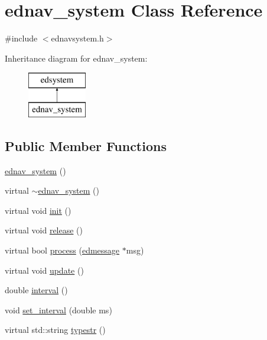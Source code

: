 \hypertarget{classednav__system}{\section{ednav\-\_\-system Class Reference}
\label{classednav__system}
}


{\ttfamily \#include $<$ednavsystem.\-h$>$}

Inheritance diagram for ednav\-\_\-system\-:\begin{figure}[H]
\begin{center}
\leavevmode
\includegraphics[height=2.000000cm]{classednav__system}
\end{center}
\end{figure}
\subsection*{Public Member Functions}
\begin{DoxyCompactItemize}
\item 
\hyperlink{classednav__system_ab9f404145bc9a1c21f221da04e73726a}{ednav\-\_\-system} ()
\item 
virtual \hyperlink{classednav__system_a81d991d9380e3cd80f0c65e8ccf35f40}{$\sim$ednav\-\_\-system} ()
\item 
virtual void \hyperlink{classednav__system_a98bc9b1cecf79a6ca7145e34a0273ca2}{init} ()
\item 
virtual void \hyperlink{classednav__system_aa41383e31657188e5386b45d4dd7e4cd}{release} ()
\item 
virtual bool \hyperlink{classednav__system_ae90088e1c3a01fdeb0fc051af71e6d6a}{process} (\hyperlink{structedmessage}{edmessage} $\ast$msg)
\item 
virtual void \hyperlink{classednav__system_a3a32c9f0ee4c089ac2e0eff9dae9a879}{update} ()
\item 
double \hyperlink{classednav__system_ae99f310450a1ec9a2e106db05d90f96a}{interval} ()
\item 
void \hyperlink{classednav__system_a6648f9731b39a60fbdef7c254aa341ac}{set\-\_\-interval} (double ms)
\item 
virtual std\-::string \hyperlink{classednav__system_a3d604cf5dcff8c1c7d8c492e213c1e3c}{typestr} ()
\end{DoxyCompactItemize}
